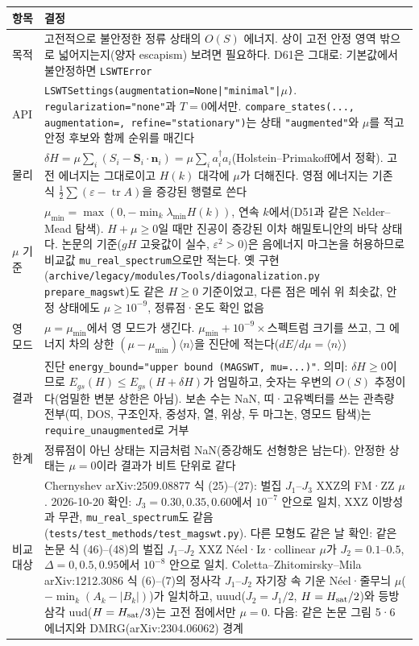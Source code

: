   \begin{tabularx}{\textwidth}{@{}P{3.0cm}Y@{}}
    \toprule
    항목 & 결정 \\
    \midrule
    목적 & 고전적으로 불안정한 정류 상태의 $O(S)$ 에너지. 상이 고전 안정 영역 밖으로 넓어지는지(양자 escapism) 보려면 필요하다. D61은 그대로: 기본값에서 불안정하면 \texttt{LSWTError} \\
    API & \texttt{LSWTSettings(augmentation=None|"minimal"|}$\mu$\texttt{)}. \texttt{regularization="none"}과 $T=0$에서만. \texttt{compare\_states(..., augmentation=, refine="stationary")}는 상태 \texttt{"augmented"}와 $\mu$를 적고 안정 후보와 함께 순위를 매긴다 \\
    물리 & $\delta H=\mu\sum_i(S_i-\mathbf S_i\cdot\mathbf n_i)=\mu\sum_i a_i^\dagger a_i$(Holstein--Primakoff에서 정확). 고전 에너지는 그대로이고 $H(k)$ 대각에 $\mu$가 더해진다. 영점 에너지는 기존 식 $\tfrac12\sum(\varepsilon-\operatorname{tr}A)$을 증강된 행렬로 쓴다 \\
    $\mu$ 기준 & $\mu_{\min}=\max(0,-\min_k\lambda_{\min}H(k))$, 연속 $k$에서(D51과 같은 Nelder--Mead 탐색). $H+\mu\ge0$일 때만 진공이 증강된 이차 해밀토니안의 바닥 상태다. 논문의 기준($gH$ 고윳값이 실수, $\varepsilon^2>0$)은 음에너지 마그논을 허용하므로 비교값 \texttt{mu\_real\_spectrum}으로만 적는다. 옛 구현(\texttt{archive/legacy/modules/Tools/diagonalization.py} \texttt{prepare\_magswt})도 같은 $H\ge0$ 기준이었고, 다른 점은 메쉬 위 최솟값, 안정 상태에도 $\mu\ge10^{-9}$, 정류점·온도 확인 없음 \\
    영 모드 & $\mu=\mu_{\min}$에서 영 모드가 생긴다. $\mu_{\min}+10^{-9}\times$스펙트럼 크기를 쓰고, 그 에너지 차의 상한 $(\mu-\mu_{\min})\langle n\rangle$을 진단에 적는다($dE/d\mu=\langle n\rangle$) \\
    결과 & 진단 \texttt{energy\_bound="upper bound (MAGSWT, mu=...)"}. 의미: $\delta H\ge0$이므로 $E_{gs}(H)\le E_{gs}(H+\delta H)$가 엄밀하고, 숫자는 우변의 $O(S)$ 추정이다(엄밀한 변분 상한은 아님). 보손 수는 NaN, 띠·고유벡터를 쓰는 관측량 전부(띠, DOS, 구조인자, 중성자, 열, 위상, 두 마그논, 영모드 탐색)는 \texttt{require\_unaugmented}로 거부 \\
    한계 & 정류점이 아닌 상태는 지금처럼 NaN(증강해도 선형항은 남는다). 안정한 상태는 $\mu=0$이라 결과가 비트 단위로 같다 \\
    비교 대상 & Chernyshev arXiv:2509.08877 식 (25)--(27): 벌집 $J_1$--$J_3$ XXZ의 FM·ZZ $\mu$. 2026-10-20 확인: $J_3=0.30,0.35,0.60$에서 $10^{-7}$ 안으로 일치, XXZ 이방성과 무관, \texttt{mu\_real\_spectrum}도 같음(\texttt{tests/test\_methods/test\_magswt.py}). 다른 모형도 같은 날 확인: 같은 논문 식 (46)--(48)의 벌집 $J_1$--$J_2$ XXZ Néel·Iz·collinear $\mu$가 $J_2=0.1$--$0.5$, $\Delta=0,0.5,0.95$에서 $10^{-8}$ 안으로 일치. Coletta--Zhitomirsky--Mila arXiv:1212.3086 식 (6)--(7)의 정사각 $J_1$--$J_2$ 자기장 속 기운 Néel·줄무늬 $\mu$($-\min_k(A_k-|B_k|)$)가 일치하고, uuud($J_2=J_1/2$, $H=H_{\rm sat}/2$)와 등방 삼각 uud($H=H_{\rm sat}/3$)는 고전 점에서만 $\mu=0$. 다음: 같은 논문 그림 5·6 에너지와 DMRG(arXiv:2304.06062) 경계 \\
    \bottomrule
  \end{tabularx}
\endgroup

